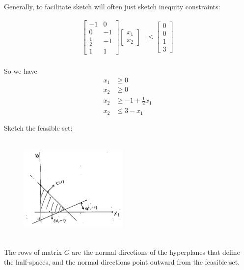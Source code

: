 \begin{example}
	Generally, to facilitate sketch will often just sketch inequity constraints:
	
	\begin{align*}
		\begin{bmatrix}
			-1 & 0\\
			0 & -1\\
			\frac{1}{2} & -1\\
			1 & 1
		\end{bmatrix}
		\begin{bmatrix}
			x_1\\
			x_2
		\end{bmatrix}
		&\leq 
		\begin{bmatrix}
			0\\
			0\\
			1\\
			3
		\end{bmatrix}\\
	\end{align*}
	
	
	So we have
	\begin{align*}
	x_1 &\geq 0\\
	x_2 &\geq 0\\
	x_2 &\geq -1 + \frac{1}{2}x_1\\
	x_2 &\leq 3 - x_1
	\end{align*}
	
	
	Sketch the feasible set:
	
	\begin{figure}
		\centering
		\includegraphics[width=2.1in,height=2.1in]{figures/ch07/figure1012_5.png}
	\end{figure}
\end{example}

The rows of matrix $G$ are the normal directions of the hyperplanes that define the half-spaces, and the normal directions point outward from the feasible set.


